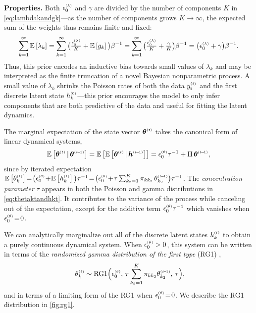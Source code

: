 \documentclass{article}
\begin{document}
\textbf{Properties.}
Both $\epslambda$ and $\gamma$ are divided by the number of components $K$ in \cref{eq:lambdakandgk}---as the number of components grows $K \!\rightarrow\! \infty$, the expected sum of the weights thus remains finite and fixed:~
\begin{equation}
\sum_{k=1}^\infty \E{\lambda_k} = \sum_{k=1}^\infty \big(\tfrac{\epslambda}{K} + \E{g_k}\big) \beta^{-1} = \sum_{k=1}^\infty \big(\tfrac{\epslambda}{K} + \tfrac{\gamma}{K} \big)\beta^{-1} = \big(\epslambda + \gamma \big)\beta^{-1}.
\end{equation}
Thus, this prior encodes an inductive bias towards small values of $\lambda_k$ and may be interpreted as the finite truncation of a novel Bayesian nonparametric process. A small value of $\lambda_k$ shrinks the Poisson rates of both the data $\ydt$ and the first discrete latent state $h^{\mathsmaller{(0)}}_k$---this prior encourages the model to only infer components that are both predictive of the data and useful for fitting the latent dynamics.~

The marginal expectation of the state vector $\boldsymbol{\theta}^{\mathsmaller{(t)}}$ takes the canonical form of linear dynamical systems,~
\begin{align}
\label{eq:expectation}
\mathbb{E}\left[\boldsymbol{\theta}^{\mathsmaller{(t)}} \given \boldsymbol{\theta}^{\mathsmaller{(t \tm 1)}}\right] = \mathbb{E}\left[\mathbb{E}\left[\boldsymbol{\theta}^{\mathsmaller{(t)}} \given \boldsymbol{h}^{\mathsmaller{(t \tm 1)}}\right]\right] = \epstheta \tau^{-1} + \Pi \, \boldsymbol{\theta}^{\mathsmaller{(t \tm 1)}},
\end{align}
since by iterated expectation $\E{\thetakt} \teq \big(\epstheta \tp \E{\hkt}\big)\tau^{-1} \teq \big(\epstheta \tp \tau \sum_{k_2 = 1}^K \pi_{kk_2} \,\thetakttm \big) \tau^{-1}$. The \emph{concentration parameter} $\tau$ appears in both the Poisson and gamma distributions in \cref{eq:thetaktandhkt}. It contributes to the variance of the process while canceling out of the expectation, except for the additive term $\epstheta \tau^{-1}$ which vanishes when $\epstheta \teq 0$.

We can analytically marginalize out all of the discrete latent states $\hkt$ to obtain a purely continuous dynamical system. When $\epstheta > 0$, this system can be written in terms of the \emph{randomized gamma distribution of the first type} (RG1) \cite{yuan2000bessel,makarov2010exact},~
\begin{equation}
\label{eq:rg1}
\
\thetakt \sim \textrm{RG1}\Big(\epstheta,\,\tau\sum_{k_2=1}^K \pi_{kk_2} \thetakttm,\, \tau\Big),
% 
\end{equation}
and in terms of a limiting form of the RG1 when $\epstheta \teq 0$. We describe the RG1 distribution in \cref{fig:rg1}.~
\end{document}
